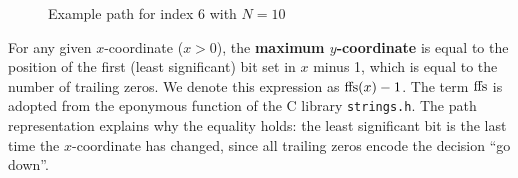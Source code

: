 \begin{figure}[H]
\centering
{}
\caption{Example path for index $6$ with $N = 10$}
\label{fig:indexTreePath}
\end{figure}

For any given $x$-coordinate ($x > 0$), the \textbf{maximum $y$-coordinate} is equal to the position of the first (least significant) bit set in $x$ minus 1,
which is equal to the number of trailing zeros. We denote this expression as $\textrm{ffs} (x) - 1$. The term $\textrm{ffs}$ is adopted from the eponymous function
of the C library \texttt{strings.h}.
The path representation explains why the equality holds: the least significant bit is the last time the $x$-coordinate has changed, since all
trailing zeros encode the decision \enquote{go down}.


%
%	
%
%
%
